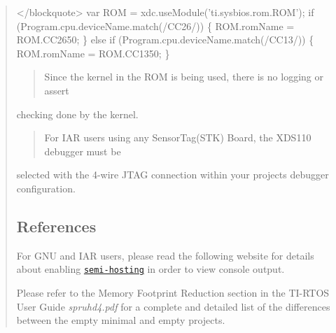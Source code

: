\begin{quote}

\begin{DoxyCode}
</blockquote>
    var ROM = xdc.useModule('ti.sysbios.rom.ROM');
    if (Program.cpu.deviceName.match(/CC26/)) \{
        ROM.romName = ROM.CC2650;
    \}
    else if (Program.cpu.deviceName.match(/CC13/)) \{
        ROM.romName = ROM.CC1350;
    \}
\end{DoxyCode}


\begin{quote}
Since the kernel in the R\+OM is being used, there is no logging or assert \end{quote}
checking done by the kernel.

\begin{quote}
For I\+AR users using any Sensor\+Tag(\+S\+T\+K) Board, the X\+D\+S110 debugger must be \end{quote}
selected with the 4-\/wire J\+T\+AG connection within your projects\textquotesingle{} debugger configuration.

\subsection*{References}




\begin{DoxyItemize}
\item For G\+NU and I\+AR users, please read the following website for details about enabling \href{http://processors.wiki.ti.com/index.php/TI-RTOS_Examples_SemiHosting}{\tt semi-\/hosting} in order to view console output.
\item Please refer to the Memory Footprint Reduction section in the T\+I-\/\+R\+T\+OS User Guide {\itshape spruhd4.\+pdf} for a complete and detailed list of the differences between the empty minimal and empty projects. 
\end{DoxyItemize}\end{quote}
